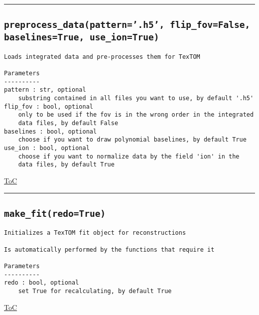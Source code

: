 \documentclass{article}
\begin{document}


\vspace{5mm}

\hrule

\subsection*{\texttt{preprocess\_data(pattern='.h5', flip\_fov=False, baselines=True, use\_ion=True)}}

\begin{lstlisting}[language=docstring]
Loads integrated data and pre-processes them for TexTOM

Parameters
----------
pattern : str, optional
    substring contained in all files you want to use, by default '.h5'
flip_fov : bool, optional
    only to be used if the fov is in the wrong order in the integrated
    data files, by default False
baselines : bool, optional
    choose if you want to draw polynomial baselines, by default True
use_ion : bool, optional
    choose if you want to normalize data by the field 'ion' in the 
    data files, by default True
\end{lstlisting}

\begin{flushright}

\hyperref[toc]{ToC}

\end{flushright}



\vspace{5mm}

\hrule

\subsection*{\texttt{make\_fit(redo=True)}}

\begin{lstlisting}[language=docstring]
Initializes a TexTOM fit object for reconstructions

Is automatically performed by the functions that require it

Parameters
----------
redo : bool, optional
    set True for recalculating, by default True
\end{lstlisting}

\begin{flushright}

\hyperref[toc]{ToC}

\end{flushright}
\end{document}
